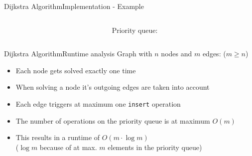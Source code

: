 
\begin{frame}{Dijkstra Algorithm}{Implementation - Example}
  \begin{columns}[T]
    \begin{column}{0.6\linewidth}
      \begin{center}
        \begin{adjustbox}{width=0.9\linewidth}
          
        \end{adjustbox}
      \end{center}
    \end{column}
    \begin{column}{0.4\linewidth}
      Priority queue:
    \end{column}
  \end{columns}
\end{frame}


\begin{frame}{Dijkstra Algorithm}{Runtime analysis}
  Graph with {\color{Mittel-Blau}$n$} nodes and {\color{Mittel-Blau}$m$}
  edges: ({\color{Mittel-Blau}$m \geq n$})
  \begin{itemize}
    \item
      Each node gets solved exactly {\color{Mittel-Blau}one time}
    \item
      When solving a node it's outgoing edges are taken into account
    \item
      Each edge triggers at maximum one \texttt{insert} operation
    \item
      The number of operations on the {\color{Mittel-Blau}priority queue}
      is at maximum {\color{Mittel-Blau}$O(m)$}
    \item
      This results in a runtime of
      {\color{Mittel-Blau}$O(m \cdot \log m)$}\\
      {\color{gray}($\log m$ because of at max. $m$ elements in the priority
        queue)}
  \end{itemize}
\end{frame}


